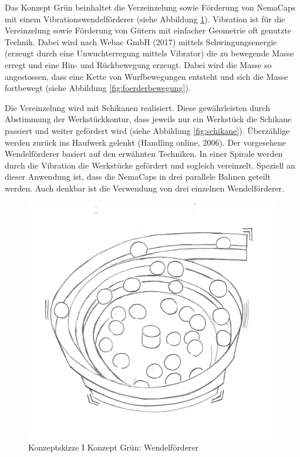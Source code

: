 Das Konzept Grün beinhaltet die Verzeinzelung sowie Förderung von NemaCaps mit einem Vibrationswendelförderer (siehe Abbildung \ref{fig:vereinzelung_green}). Vibration ist für die Vereinzelung sowie Förderung von Gütern mit einfacher Geometrie oft genutzte Technik. Dabei wird nach Webac GmbH (2017) mittels Schwingungsenergie (erzeugt durch eine Unwuchterregung mittels Vibrator) die zu bewegende Masse erregt und eine Hin- und Rückbewegung erzeugt. Dabei wird die Masse so angestossen, dass eine Kette von Wurfbewegungen entsteht und sich die Masse fortbewegt (siehe Abbildung \ref{fig:foerderbewegung}).
\newline

Die Vereinzelung wird mit Schikanen realisiert. Diese gewährleisten durch Abstimmung der Werkstückkontur, dass jeweils nur ein Werkstück die Schikane passiert und weiter gefördert wird (siehe Abbildung \ref{fig:schikane}). Überzählige werden zurück ins Haufwerk gelenkt (Handling online, 2006).
\newline
Der vorgesehene Wendelförderer basiert auf den erwähnten Techniken. In einer Spirale werden durch die Vibration die Werkstücke gefördert und sogleich vereinzelt. Speziell an dieser Anwendung ist, dass die NemaCaps in drei parallele Bahnen geteilt werden. Auch denkbar ist die Verwendung von drei einzelnen Wendelförderer.
\newline
\begin{figure}[H]
	\includegraphics[scale=0.6]{Illustrationen/5-Konzept/green_wendelfoerderer.jpg}
	\caption{Konzeptskizze I Konzept Grün: Wendelförderer}
	\label{fig:vereinzelung_green}
\end{figure}

